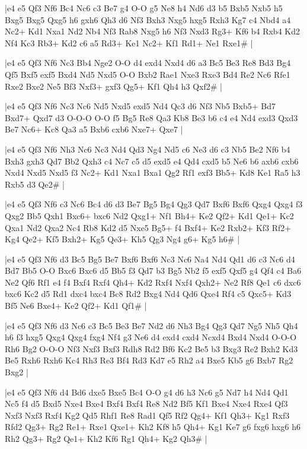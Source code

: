 \whitename{}
\blackname{}
\makegametitle
|e4 e5 Qf3 Nf6 Bc4 Nc6 c3 Be7 g4 O-O g5 Ne8 h4 Nd6 d3 b5 Bxb5 Nxb5 h5 Bxg5 Bxg5 Qxg5 h6 gxh6 Qh3 d6 Nf3 Bxh3 Nxg5 hxg5 Rxh3 Kg7 c4 Nbd4 a4 Nc2+ Kd1 Nxa1 Nd2 Nb4 Nf3 Rab8 Nxg5 h6 Nf3 Nxd3 Rg3+ Kf6 b4 Rxb4 Kd2 Nf4 Kc3 Rb3+ Kd2 c6 a5 Rd3+ Ke1 Nc2+ Kf1 Rd1+ Ne1 Rxe1\#  |

\whitename{}
\blackname{}
\makegametitle
|e4 e5 Qf3 Nf6 Nc3 Bb4 Nge2 O-O d4 exd4 Nxd4 d6 a3 Bc5 Be3 Re8 Bd3 Bg4 Qf5 Bxf5 exf5 Bxd4 Nd5 Nxd5 O-O Bxb2 Rae1 Nxe3 Rxe3 Bd4 Re2 Nc6 Rfe1 Rxe2 Bxe2 Ne5 Bf3 Nxf3+ gxf3 Qg5+ Kf1 Qh4 h3 Qxf2\#  |

\whitename{}
\blackname{}
\makegametitle
|e4 e5 Qf3 Nf6 Nc3 Nc6 Nd5 Nxd5 exd5 Nd4 Qc3 d6 Nf3 Nb5 Bxb5+ Bd7 Bxd7+ Qxd7 d3 O-O-O O-O f5 Bg5 Re8 Qa3 Kb8 Be3 b6 c4 e4 Nd4 exd3 Qxd3 Be7 Nc6+ Kc8 Qa3 a5 Bxb6 cxb6 Nxe7+ Qxe7  |

\whitename{}
\blackname{}
\makegametitle
|e4 e5 Qf3 Nf6 Nh3 Nc6 Nc3 Nd4 Qd3 Ng4 Nd5 c6 Ne3 d6 c3 Nb5 Be2 Nf6 b4 Bxh3 gxh3 Qd7 Bb2 Qxh3 c4 Nc7 c5 d5 exd5 e4 Qd4 cxd5 b5 Ne6 b6 axb6 cxb6 Nxd4 Nxd5 Nxd5 f3 Nc2+ Kd1 Nxa1 Bxa1 Qg2 Rf1 exf3 Bb5+ Kd8 Ke1 Ra5 h3 Rxb5 d3 Qe2\#  |

\whitename{}
\blackname{}
\makegametitle
|e4 e5 Qf3 Nf6 c3 Nc6 Bc4 d6 d3 Be7 Bg5 Bg4 Qg3 Qd7 Bxf6 Bxf6 Qxg4 Qxg4 f3 Qxg2 Bb5 Qxh1 Bxc6+ bxc6 Nd2 Qxg1+ Nf1 Bh4+ Ke2 Qf2+ Kd1 Qe1+ Kc2 Qxa1 Nd2 Qxa2 Nc4 Rb8 Kd2 d5 Nxe5 Bg5+ f4 Bxf4+ Ke2 Rxb2+ Kf3 Rf2+ Kg4 Qe2+ Kf5 Bxh2+ Kg5 Qe3+ Kh5 Qg3 Ng4 g6+ Kg5 h6\#  |

\whitename{}
\blackname{}
\makegametitle
|e4 e5 Qf3 Nf6 d3 Bc5 Bg5 Be7 Bxf6 Bxf6 Nc3 Nc6 Na4 Nd4 Qd1 d6 c3 Nc6 d4 Bd7 Bb5 O-O Bxc6 Bxc6 d5 Bb5 f3 Qd7 b3 Bg5 Nb2 f5 exf5 Qxf5 g4 Qf4 c4 Ba6 Ne2 Qf6 Rf1 e4 f4 Bxf4 Rxf4 Qh4+ Kd2 Rxf4 Nxf4 Qxh2+ Ne2 Rf8 Qe1 c6 dxc6 bxc6 Kc2 d5 Rd1 dxc4 bxc4 Bc8 Rd2 Bxg4 Nd4 Qd6 Qxe4 Rf4 c5 Qxc5+ Kd3 Bf5 Ne6 Bxe4+ Ke2 Qf2+ Kd1 Qf1\#  |

\whitename{}
\blackname{}
\makegametitle
|e4 e5 Qf3 Nf6 d3 Nc6 c3 Bc5 Be3 Be7 Nd2 d6 Nh3 Bg4 Qg3 Qd7 Ng5 Nh5 Qh4 h6 f3 hxg5 Qxg4 Qxg4 fxg4 Nf4 g3 Ne6 d4 exd4 cxd4 Ncxd4 Bxd4 Nxd4 O-O-O Rh6 Bg2 O-O-O Nf3 Nxf3 Bxf3 Rdh8 Rd2 Bf6 Kc2 Be5 b3 Bxg3 Re2 Bxh2 Kd3 Be5 Rxh6 Rxh6 Kc4 Rh3 Re3 Bf4 Rd3 Kd7 e5 Rh2 a4 Bxe5 Kb5 g6 Bxb7 Rg2 Bxg2  |

\whitename{}
\blackname{}
\makegametitle
|e4 e5 Qf3 Nf6 d4 Bd6 dxe5 Bxe5 Bc4 O-O g4 d6 h3 Nc6 g5 Nd7 h4 Nd4 Qd1 Nc5 f4 d5 Bxd5 Nxe4 Bxe4 Bxf4 Bxf4 Re8 Nd2 Bf5 Kf1 Bxe4 Nxe4 Rxe4 Qf3 Nxf3 Nxf3 Rxf4 Kg2 Qd5 Rhf1 Re8 Rad1 Qf5 Rf2 Qg4+ Kf1 Qh3+ Kg1 Rxf3 Rfd2 Qg3+ Rg2 Re1+ Rxe1 Qxe1+ Kh2 Kf8 h5 Qh4+ Kg1 Ke7 g6 fxg6 hxg6 h6 Rh2 Qg3+ Rg2 Qe1+ Kh2 Kf6 Rg1 Qh4+ Kg2 Qh3\#  |

